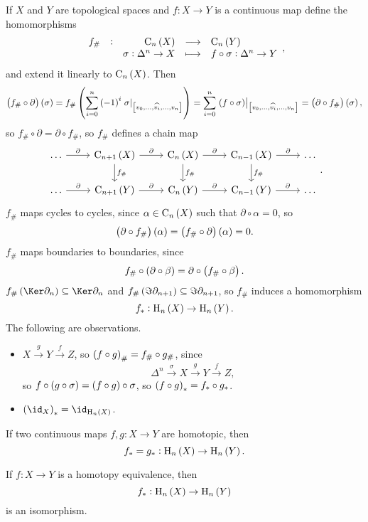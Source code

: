 If $ X $ and $ Y $ are topological spaces and $ f : X \to Y $ is a continuous map define the homomorphisms
$$ \function[f_\#]{\C_n\br{X}}{\C_n\br{Y}}{\sigma : \Delta^n \to X}{f \circ \sigma : \Delta^n \to Y}, $$
and extend it linearly to $ \C_n\br{X} $. Then
$$ \br{f_\# \circ \partial}\br{\sigma} = f_\#\br{\sum_{i = 0}^n \br{-1}^i\eval{\sigma}_{\sbr{v_0, \dots, \widehat{v_i}, \dots, v_n}}} = \sum_{i = 0}^n \eval{\br{f \circ \sigma}}_{\sbr{v_0, \dots, \widehat{v_i}, \dots, v_n}} = \br{\partial \circ f_\#}\br{\sigma}, $$
so $ f_\# \circ \partial = \partial \circ f_\# $, so $ f_\# $ defines a chain map
$$
\begin{tikzcd}
\dots \arrow{r}{\partial} & \C_{n + 1}\br{X} \arrow{r}{\partial} \arrow{d}{f_\#} & \C_n\br{X} \arrow{r}{\partial} \arrow{d}{f_\#} & \C_{n - 1}\br{X} \arrow{r}{\partial} \arrow{d}{f_\#} & \dots \\
\dots \arrow{r}{\partial} & \C_{n + 1}\br{Y} \arrow{r}{\partial} & \C_n\br{Y} \arrow{r}{\partial} & \C_{n - 1}\br{Y} \arrow{r}{\partial} & \dots
\end{tikzcd}.
$$
$ f_\# $ maps cycles to cycles, since $ \alpha \in \C_n\br{X} $ such that $ \partial \circ \alpha = 0 $, so
$$ \br{\partial \circ f_\#}\br{\alpha} = \br{f_\# \circ \partial}\br{\alpha} = 0. $$
$ f_\# $ maps boundaries to boundaries, since
$$ f_\# \circ \br{\partial \circ \beta} = \partial \circ \br{f_\# \circ \beta}. $$
$ f_\#\br{\Ker \partial_n} \subseteq \Ker \partial_n $ and $ f_\#\br{\Im \partial_{n + 1}} \subseteq \Im \partial_{n + 1} $, so $ f_\# $ induces a homomorphism
$$ f_* : \H_n\br{X} \to \H_n\br{Y}. $$
The following are observations.
\begin{itemize}
\item $ X \xrightarrow{g} Y \xrightarrow{f} Z $, so $ \br{f \circ g}_\# = f_\# \circ g_\# $, since
$$ \Delta^n \xrightarrow{\sigma} X \xrightarrow{g} Y \xrightarrow{f} Z, $$
so $ f \circ \br{g \circ \sigma} = \br{f \circ g} \circ \sigma $, so $ \br{f \circ g}_* = f_* \circ g_* $.
\item $ \br{\id_X}_* = \id_{\H_n\br{X}} $.
\end{itemize}

\begin{theorem}
\label{thm:2.10}
If two continuous maps $ f, g : X \to Y $ are homotopic, then
$$ f_* = g_* : \H_n\br{X} \to \H_n\br{Y}. $$
\end{theorem}

\begin{corollary}
If $ f : X \to Y $ is a homotopy equivalence, then
$$ f_* : \H_n\br{X} \to \H_n\br{Y} $$
is an isomorphism.
\end{corollary}

